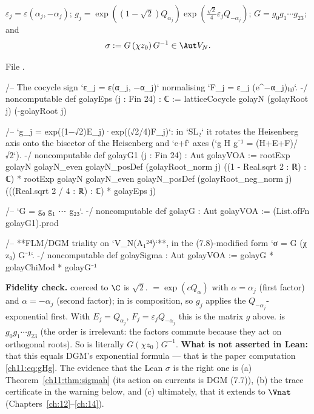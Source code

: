 \begin{definition}\label{ch11:def:golaySigma}
$\varepsilon_j=\varepsilon(\alpha_j,-\alpha_j)$; $g_j=\exp((1-\sqrt2)Q_{\alpha_j})\exp(\tfrac{\sqrt2}4\varepsilon_jQ_{-\alpha_j})$;
$G=g_0g_1\cdots g_{23}$; and
\begin{equation*}
  \sigma:=G\,(\chi z_0)\,G^{-1}\in\Aut V_N .
\end{equation*}
\end{definition}
\noindent File .
\begin{leancode}
/-- The cocycle sign `ε_j = ε(α_j, −α_j)` normalising `F_j = ε_j (e^{−α_j})₍₀₎`. -/
noncomputable def golayEps (j : Fin 24) : ℂ :=
  latticeCocycle golayN (golayRoot j) (-golayRoot j)

/-- `g_j = exp((1−√2)E_j)·exp((√2/4)F_j)`: in `SL₂` it rotates the Heisenberg axis onto the
bisector of the Heisenberg and `e+f` axes (`g H g⁻¹ = (H+E+F)/√2`). -/
noncomputable def golayG1 (j : Fin 24) : Aut golayVOA :=
  rootExp golayN golayN_even golayN_posDef (golayRoot_norm j) ((1 - Real.sqrt 2 : ℝ) : ℂ) *
    rootExp golayN golayN_even golayN_posDef (golayRoot_neg_norm j)
      (((Real.sqrt 2 / 4 : ℝ) : ℂ) * golayEps j)

/-- `G = g₀ g₁ ⋯ g₂₃`. -/
noncomputable def golayG : Aut golayVOA := (List.ofFn golayG1).prod

/-- **FLM/DGM triality on `V_{N(A₁²⁴)}`**, in the (7.8)-modified form `σ = G (χ z₀) G⁻¹`. -/
noncomputable def golaySigma : Aut golayVOA := golayG * golayChiMod * golayG⁻¹
\end{leancode}
\begin{dictionary}
\textbf{Fidelity check.}   coerced to $\C$ is $\sqrt2$.  
$=\exp(cQ_\alpha)$ with $\alpha=\alpha_j$ (first factor) and $\alpha=-\alpha_j$ (second factor);
\lean{*} in  is composition, so $g_j$ applies the $Q_{-\alpha_j}$-exponential first.
With $E_j=Q_{\alpha_j}$, $F_j=\varepsilon_jQ_{-\alpha_j}$ this is the matrix $g$ above.
 is $g_0g_1\cdots g_{23}$ (the order is irrelevant: the factors
commute because they act on orthogonal roots).  So  is literally
$G(\chi z_0)G^{-1}$.  \textbf{What is not asserted in Lean:} that this equals DGM's exponential
formula --- that is the paper computation \eqref{ch11:eq:gHg}.  The evidence that the Lean $\sigma$
is the right one is (a) Theorem~\ref{ch11:thm:sigmah} (its action on currents is DGM (7.7)), (b) the
trace certificate in the warning below, and (c) ultimately, that it extends to $\Vnat$
(Chapters~\ref{ch:12}--\ref{ch:14}).
\end{dictionary}

